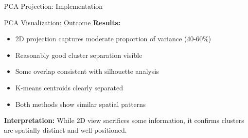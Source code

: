 \documentclass[aspectratio=169,ignorenonframetext]{beamer}
\begin{document}
\begin{frame}[fragile]{PCA Projection: Implementation}
\begin{Shaded}
\begin{Highlighting}[]

\OperatorTok{=}\OperatorTok{=}\NormalTok{)}
\OperatorTok{=}

\NormalTok{(}\SpecialCharTok{\{}\NormalTok{explained\_variance\_ratio\_[}\NormalTok{]}\NormalTok{)}
\NormalTok{(}\SpecialCharTok{\{}\NormalTok{explained\_variance\_ratio\_[}\NormalTok{]}\NormalTok{)}

\NormalTok{plt.scatter(X\_pca[:, }\NormalTok{], X\_pca[:, }\NormalTok{],}
\OperatorTok{=}\OperatorTok{=}\NormalTok{)}
\end{Highlighting}
\end{Shaded}
\end{frame}

\begin{frame}{PCA Visualization: Outcome}
\textbf{Results:}

\begin{itemize}
\item
  2D projection captures moderate proportion of variance (40-60\%)
\item
  Reasonably good cluster separation visible
\item
  Some overlap consistent with silhouette analysis
\item
  K-means centroids clearly separated
\item
  Both methods show similar spatial patterns
\end{itemize}

\textbf{Interpretation:} While 2D view sacrifices some information, it
confirms clusters are spatially distinct and well-positioned.
\end{frame}
\end{document}
